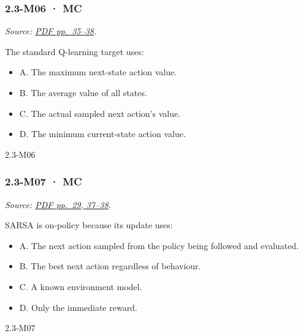 \noindent\begin{minipage}{\linewidth}

\subsubsection{2.3-M06 · MC}\label{m06-mc-5}

\emph{Source:
\href{../Lecture\%20Slides/2.3.\%20Q-learning.pdf\#page=35}{PDF
pp.~35--38}.}

The standard Q-learning target uses:

\begin{itemize}
\tightlist
\item
  A. The maximum next-state action value.
\item
  B. The average value of all states.
\item
  C. The actual sampled next action's value.
\item
  D. The minimum current-state action value.
\end{itemize}

\begin{solution}[8mm]{2.3-M06}

\end{solution}
\end{minipage}\par\medskip

\noindent\begin{minipage}{\linewidth}

\subsubsection{2.3-M07 · MC}\label{m07-mc-5}

\emph{Source:
\href{../Lecture\%20Slides/2.3.\%20Q-learning.pdf\#page=29}{PDF pp.~29,
37--38}.}

SARSA is on-policy because its update uses:

\begin{itemize}
\tightlist
\item
  A. The next action sampled from the policy being followed and
  evaluated.
\item
  B. The best next action regardless of behaviour.
\item
  C. A known environment model.
\item
  D. Only the immediate reward.
\end{itemize}

\begin{solution}[8mm]{2.3-M07}

\end{solution}
\end{minipage}\par\medskip

